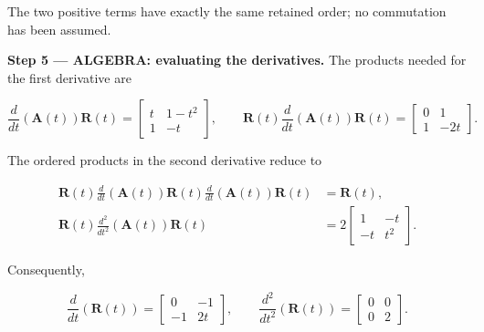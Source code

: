 \documentclass[11pt,oneside,openany]{book}
\begin{document}
The two positive terms have exactly the same retained order; no commutation has been assumed.

\begingroup\color{AlgebraBlue}
\textbf{Step 5 --- ALGEBRA: evaluating the derivatives.} The products needed for the first derivative are

\[
\frac{d}{dt}\left(\mathbf A(t)\right)\mathbf R(t)
=\begin{bmatrix}t&1-t^2\\1&-t\end{bmatrix},
\qquad
\mathbf R(t)\frac{d}{dt}\left(\mathbf A(t)\right)\mathbf R(t)
=\begin{bmatrix}0&1\\1&-2t\end{bmatrix}.
\]

The ordered products in the second derivative reduce to

\[
\begin{aligned}
\mathbf R(t)\frac{d}{dt}\left(\mathbf A(t)\right)\mathbf R(t)
\frac{d}{dt}\left(\mathbf A(t)\right)\mathbf R(t)
&=\mathbf R(t),\\
\mathbf R(t)\frac{d^2}{dt^2}\left(\mathbf A(t)\right)\mathbf R(t)
&=2\begin{bmatrix}1&-t\\-t&t^2\end{bmatrix}.
\end{aligned}
\]

Consequently,

\[
\frac{d}{dt}\left(\mathbf R(t)\right)=\begin{bmatrix}0&-1\\-1&2t\end{bmatrix},
\qquad
\frac{d^2}{dt^2}\left(\mathbf R(t)\right)=\begin{bmatrix}0&0\\0&2\end{bmatrix}.
\]
\end{document}

